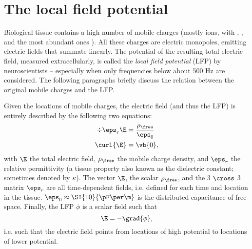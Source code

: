 \section{The local field potential}
\label{sec:LFP}

Biological tissue contains a high number of mobile charges (mostly ions, with , , and  the most abundant ones \cite{Martinsen2015a}). All these charges are electric monopoles, emitting electric fields that summate linearly. The potential of the resulting total electric field, measured extracellularly, is called the \emph{local field potential} (LFP) by neuroscientists -- especially when only frequencies below about 500 Hz are considered. The following paragraphs briefly discuss the relation between the original mobile charges and the LFP.

Given the locations of mobile charges, the electric field (and thus the LFP) is entirely described by the following two equations:\footnotemark{}
%
\begin{align}
\div{\eps_r \E}  &= \frac{\rho_\free}{\eps_0}   \label{eq:gauss} \\
\curl{\E}        &= \vb{0},                     \label{eq:irrot}
\end{align}
%
with $\E$ the total electric field, $\rho_\free$ the mobile charge density, and $\eps_r$ the relative permittivity (a tissue property also known as the dielectric constant; sometimes denoted by $\kappa$). The vector $\E$, the scalar $\rho_\free$, and the 3 $\cross$ 3 matrix $\eps_r$ are all time-dependent fields, i.e. defined for each time and location in the tissue. $\eps_0 \approx \SI{10}{\pF\per\m}$ is the distributed capacitance of free space. Finally, the LFP $\phi$ is a scalar field such that
%
\begin{equation}
\label{eq:potential}
\E = -\grad{\phi},
\end{equation}
%
i.e. such that the electric field points from locations of high potential to locations of lower potential.


